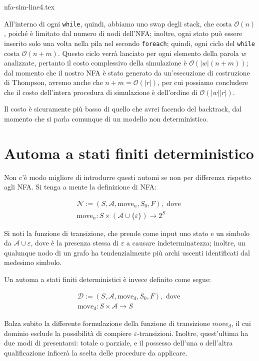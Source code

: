 \documentclass[class=book, crop=false, oneside, 12pt]{standalone}
\begin{document}
{nfa-sim-line4.tex}

All'interno di ogni \texttt{while}, quindi, abbiamo uno swap degli stack, che costa \(\mathcal{O}(n)\), poiché è limitato dal numero di nodi dell'NFA; inoltre, ogni stato può essere inserito solo una volta nella pila nel secondo \texttt{foreach}; quindi, ogni ciclo del \texttt{while} costa \(\mathcal{O}(n + m)\). Questo ciclo verrà lanciato per ogni elemento della parola \(w\) analizzate, pertanto il costo complessivo della simulazione è \(\mathcal{O}(|w|(n + m))\); dal momento che il nostro NFA è stato generato da un'esecuzione di costruzione di Thompson, avremo anche che \(n + m = \mathcal{O}(|r|)\), per cui possiamo concludere che il costo  dell'intera procedura di simulazione è dell'ordine di \(\mathcal{O}(|w||r|)\).

Il costo è sicuramente più basso di quello che avrei facendo del backtrack, dal momento che si parla comunque di un modello non deterministico. 

\section{Automa a stati finiti deterministico}
Non c'è modo migliore di introdurre questi automi se non per differenza rispetto agli NFA. Si tenga a mente la definizione di NFA:

\begin{gather*}
    \mathcal{N} := (S, \mathcal{A}, \textrm{move}_n, S_0, F), \textrm{ dove } \\
    \textrm{move}_n : S \times (\mathcal{A} \cup \{\varepsilon\}) \to 2^S
\end{gather*}

Si noti la funzione di transizione, che prende come input uno stato e un simbolo da \(\mathcal{A} \cup \varepsilon\), dove è la presenza stessa di \(\varepsilon\) a causare indeterminatezza; inoltre, un qualunque nodo di un grafo ha tendenzialmente più archi uscenti identificati dal medesimo simbolo.

Un automa a stati finiti deterministici è invece definito come segue:

\begin{gather}
    \mathcal{D} := (S, \mathcal{A}, \textrm{move}_d, S_0, F), \textrm{ dove } \\
    \textrm{move}_d : S \times \mathcal{A} \to S
\end{gather}

Balza subito la differente formulazione della funzione di transizione \(move_d\), il cui dominio esclude la possibilità di compiere \(\varepsilon\)-transizioni. Inoltre, quest'ultima ha due modi di presentarsi: totale o parziale, e il possesso dell'una o dell'altra qualificazione inficerà la scelta delle procedure da applicare.
\end{document}
